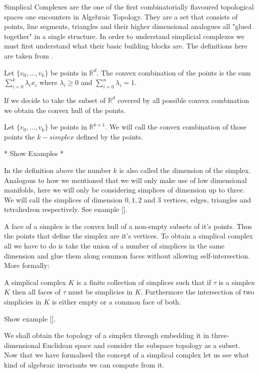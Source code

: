 Simplical Complexes are the one of the first combinatorially flavoured topological spaces one encounters in Algebraic Topology. They are a set that consists of points, line segments, triangles and their higher dimensional analogues all "glued together" in a single structure. In order to understand simplicial complexes we must first understand what their basic building blocks are. The definitions here are taken from \cite{comp-topo}.

\begin{defn} Let $\{v_0, ..., v_k\}$ be points in $\mathbb{R}^d$. The convex combination of the points is the sum $\sum_{i=0}^k{\lambda_ix_i}$ where $\lambda_i \ge 0$ and $\sum_{i=0}^n{\lambda_i} = 1$.  \end{defn}

If we decide to take the subset of $\mathbb{R}^d$ covered by all possible convex combination we obtain the convex hull of the points. 

\begin{defn} Let $\{v_0, ..., v_k\}$ be points in $\mathbb{R}^{k+1}$. We will call the convex combination of those points the $k-simplex$ defined by the points.  \end{defn}

* Show Examples *

In the definition above the number $k$ is also called the dimension of the simplex. Analogous to how we mentioned that we will only make use of low dimensional manifolds, here we will only be considering simplices of dimension up to three. We will call the simplices of dimension $0, 1, 2 \text{ and } 3$ vertices, edges, triangles and tetrahedron respectively. See example []. 

A face of a simplex is the convex hull of a non-empty subsets of it's points. Thus the points that define the simplex are it's vertices. To obtain a simplical complex all we have to do is take the union of a number of simplices in the same dimension and glue them along common faces without allowing self-intersection. More formally:

\begin{defn} A simplical complex $K$ is a finite collection of simplices such that if $\tau$ is a simplex $K$ then all faces of $\tau$ must be simplicies in $K$. Furthermore the intersection of two simplicies in $K$ is either empty or a common face of both.  \end{defn}

Show example [].

We shall obtain the topology of a simplex through embedding it in three-dimensional Euclidean space and consider the subspace topology as a subset. Now that we have formalised the concept of a simplical complex let us see what kind of algebraic invariants we can compute from it.

